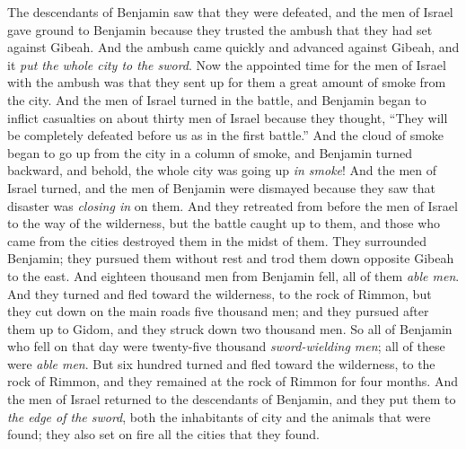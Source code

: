 \begin{biblechapter}
\verse The descendants of Benjamin saw that they were defeated, and the men of Israel gave ground to Benjamin because they trusted the ambush that they had set against Gibeah.
\verse And the ambush came quickly and advanced against Gibeah, and it \textit{put the whole city to the sword}.
\verse Now the appointed time for the men of Israel with the ambush was that they sent up for them a great amount of smoke from the city.
\verse And the men of Israel turned in the battle, and Benjamin began to inflict casualties on about thirty men of Israel because they thought, “They will be completely defeated before us as in the first battle.”
\verse And the cloud of smoke began to go up from the city in a column of smoke, and Benjamin turned backward, and behold, the whole city was going up \textit{in smoke}!
\verse And the men of Israel turned, and the men of Benjamin were dismayed because they saw that disaster was \textit{closing in} on them.
\verse And they retreated from before the men of Israel to the way of the wilderness, but the battle caught up to them, and those who came from the cities destroyed them in the midst of them.
\verse They surrounded Benjamin; they pursued them without rest and trod them down opposite Gibeah to the east.
\verse And eighteen thousand men from Benjamin fell, all of them \textit{able men}.
\verse And they turned and fled toward the wilderness, to the rock of Rimmon, but they cut down on the main roads five thousand men; and they pursued after them up to Gidom, and they struck down two thousand men.
\verse So all of Benjamin who fell on that day were twenty-five thousand \textit{sword-wielding men}; all of these were \textit{able men}.
\verse But six hundred turned and fled toward the wilderness, to the rock of Rimmon, and they remained at the rock of Rimmon for four months.
\verse And the men of Israel returned to the descendants of Benjamin, and they put them to \textit{the edge of the sword}, both the inhabitants of city and the animals that were found; they also set on fire all the cities that they found.
\end{biblechapter}

